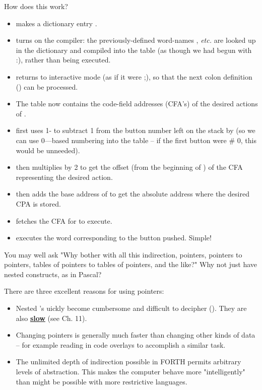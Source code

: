 How does this work?
\begin{itemize}
    \item {} makes a dictionary entry .
    \item \bc{]} turns on the compiler: the previously-defined word-names , \textit{etc.} are looked up in the dictionary and compiled into the table (as though we had begun with :), rather than being executed.
    \item \bc{[} returns to interactive mode (as if it were ;), so that the next colon definition () can be processed.
    \item The table  now contains the code-field addresses (CFA’s) of the desired actions of .
    \item {} first uses 1- to subtract 1 from the button number left on the stack by  (so we can use 0—based numbering into the table -- if the first button were \# 0, this would be unneeded).
    \item {} then multiplies by 2 to get the offset (from the beginning of ) of the CFA representing the desired action.
    \item {} then adds the base address of  to get the absolute address where the desired CPA is stored.
    \item {} fetches the CFA for  to execute.
    \item {} executes the word corresponding to the button pushed. Simple!
\end{itemize}

You may well ask "Why bother with all this indirection, pointers, pointers to pointers, tables of pointers to tables of pointers, and the like?" Why not just have nested  constructs, as in Pascal?

There are three excellent reasons for using pointers:
\begin{itemize}
    \item Nested 's uickly become cumbersome and difficult to decipher (\TF). They are also \underline{\textbf{slow}} (see Ch. 11).
    \item Changing pointers is generally much faster than changing other kinds of data -- for example reading in code overlays to accomplish a similar task.
    \item The unlimited depth of indirection possible in FORTH permits arbitrary levels of abstraction. This makes the computer behave more "intelligently" than might be possible with more restrictive languages.
\end{itemize}

